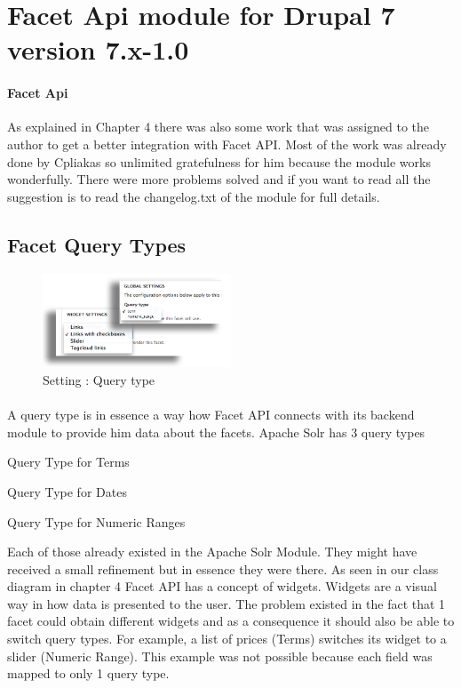 \section{Facet Api module for Drupal 7 version 7.x-1.0}
\paragraph{Facet Api} As explained in Chapter 4 there was also some work that was assigned to the author to get a better integration with Facet API. Most of the work was already done by Cpliakas so unlimited gratefulness for him because the module works wonderfully. There were more problems solved and if you want to read all the suggestion is to read the changelog.txt of the module for full details. 

\subsection{Facet Query Types}
\begin{figure}
\begin{center}
     \includegraphics[width=0.5\textwidth]{images/implementation/facet_query_type_and_widget.png}
     \caption{Setting : Query type}
\end{center}
\end{figure}
\paragraph{}
A query type is in essence a way how Facet API connects with its backend module to provide him data about the facets. Apache Solr has 3 query types
\begin{packed_itemize}
\item Query Type for Terms
\item Query Type for Dates
\item Query Type for Numeric Ranges
\end{packed_itemize}

Each of those already existed in the Apache Solr Module. They might have received a small refinement but in essence they were there. As seen in our class diagram in chapter 4 Facet API has a concept of widgets. Widgets are a visual way in how data is presented to the user. 
The problem existed in the fact that 1 facet could obtain different widgets and as a consequence it should also be able to switch query types. For example, a list of prices (Terms) switches its widget to a slider (Numeric Range). This example was not possible because each field was mapped to only 1 query type.

